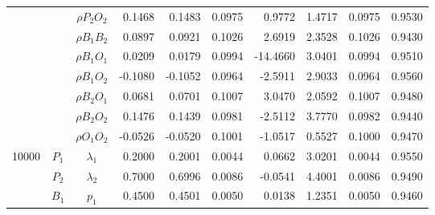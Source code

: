 \documentclass[letterpaper]{article}
\begin{document}
\begin{table}[h]
\begin{tabular}{cccrrrrrrr}
            &             & $\rho{P_2O_2}$ & 0.1468                 & 0.1483                 & 0.0975                 & 0.9772                 & 1.4717                 & 0.0975                   & 0.9530                 \\
            &             & $\rho{B_1B_2}$ & 0.0897                 & 0.0921                 & 0.1026                 & 2.6919                 & 2.3528                 & 0.1026                   & 0.9430                 \\
            &             & $\rho{B_1O_1}$ & 0.0209                 & 0.0179                 & 0.0994                 & -14.4660               & 3.0401                 & 0.0994                   & 0.9510                 \\
            &             & $\rho{B_1O_2}$ & -0.1080                & -0.1052                & 0.0964                 & -2.5911                & 2.9033                 & 0.0964                   & 0.9560                 \\
            &             & $\rho{B_2O_1}$ & 0.0681                 & 0.0701                 & 0.1007                 & 3.0470                 & 2.0592                 & 0.1007                   & 0.9480                 \\
            &             & $\rho{B_2O_2}$ & 0.1476                 & 0.1439                 & 0.0981                 & -2.5112                & 3.7770                 & 0.0982                   & 0.9440                 \\
            &             & $\rho{O_1O_2}$ & -0.0526                & -0.0520                & 0.1001                 & -1.0517                & 0.5527                 & 0.1000                   & 0.9470                 \\\hline
10000       & $P_1$       & $\lambda_1$    & 0.2000                 & 0.2001                 & 0.0044                 & 0.0662                 & 3.0201                 & 0.0044                   & 0.9550                 \\
            & $P_2$       & $\lambda_2$    & 0.7000                 & 0.6996                 & 0.0086                 & -0.0541                & 4.4001                 & 0.0086                   & 0.9490                 \\
            & $B_1$       & $p_1$          & 0.4500                 & 0.4501                 & 0.0050                 & 0.0138                 & 1.2351                 & 0.0050                   & 0.9460                 \\

\end{tabular}
\end{table}
\end{document}
